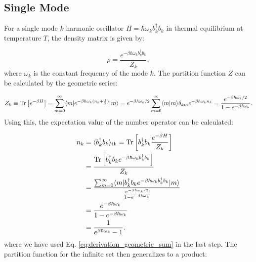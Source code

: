 \subsection{Single Mode}
For a single mode \( k \) harmonic oscillator \( H = \hbar \omega_k b_k^{\dagger} b_k \) in thermal equilibrium at temperature \( T \), the density matrix is given by:

\begin{equation} \label{eq:single_mode_density_matrix}
	\rho = \frac{e^{-\beta \hbar \omega_k b_k^{\dagger} b_k}}{Z_k},
\end{equation}
where \( \omega_k \) is the constant frequency of the mode \( k \).
The partition function \( Z \) can be calculated by the geometric series:

\begin{equation} \label{eq:partition_function}
	Z_k \equiv \Tr\left[e^{-\beta H}\right] 
	= \sum_{m=0}^{\infty} \langle m | e^{-\beta \hbar \omega_k (n_k + \frac{1}{2})} | m \rangle
	= e^{-\beta \hbar \omega_k / 2} \sum_{m=0}^{\infty} \langle m | m \rangle \delta_{km} e^{-\beta \hbar \omega_k n_k} \\
	= \frac{e^{-\beta \hbar \omega_k / 2}}{1 - e^{-\beta \hbar \omega_k}}. %
\end{equation}
Using this, the expectation value of the number operator can be calculated:

\begin{align} \label{eq:expectation_number_operator}
	n_k & = \langle b_k^{\dagger} b_k \rangle_{\text{th}} = \mathrm{Tr} \left[ b_k^{\dagger} b_k \frac{e^{-\beta H}}{Z_k} \right]                                           \\
	    & = \frac{\mathrm{Tr} \left[ b_k^{\dagger} b_k e^{-\beta \hbar \omega_k b_k^{\dagger} b_k} \right]}{Z_k}                                                            \\
	    & = \frac{\sum_{m=0}^{\infty} \langle m|b_k^{\dagger} b_k e^{-\beta \hbar \omega_k b_k^{\dagger} b_k}|m \rangle}{\frac{e^{-\beta \hbar \omega_k / 2}}{1 - e^{-\beta \hbar \omega_k}}} \\
	    & = \frac{e^{-\beta \hbar \omega_k}}{1 - e^{-\beta \hbar \omega_k}} \\
	    & = \frac{1}{e^{\beta \hbar \omega_k} - 1}.
\end{align}
where we have used Eq. \eqref{eq:derivation_geometric_sum} in the last step.
The partition function for the infinite set then generalizes to a product:

